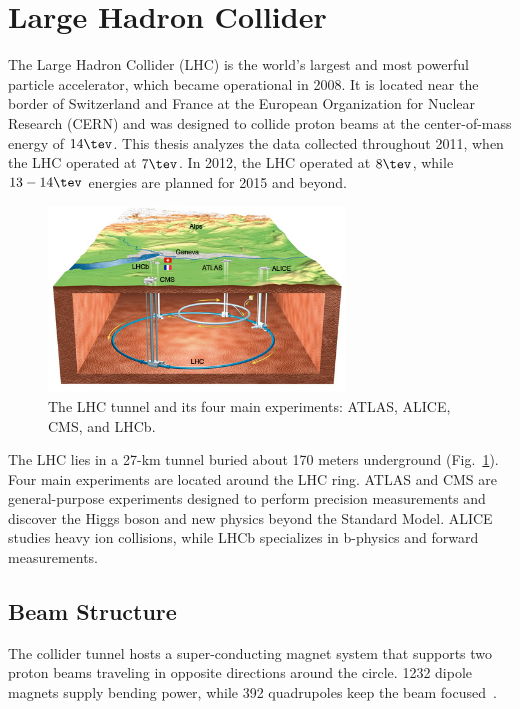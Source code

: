 
\section{ Large Hadron Collider}
The Large Hadron Collider (LHC) is the world's largest and most powerful particle accelerator, which became operational in 2008. It is located near the border of Switzerland and France at the European Organization for Nuclear Research (CERN) and was designed to collide proton beams at the center-of-mass energy of $14\tev$. This thesis analyzes the data collected throughout 2011, when the LHC operated at $7\tev$. In 2012, the LHC operated at $8\tev$, while $13-14\tev$ energies are planned for 2015 and beyond.

\begin{figure}[phtb]
  \begin{center}
    \includegraphics[width=0.7\textwidth]{det/fig/LHC_map}
    \caption{ The LHC tunnel and its four main experiments: ATLAS, ALICE, CMS, and LHCb.}
    \label{fig:det:tunnel}
  \end{center}
\end{figure}

The LHC lies in a 27-km tunnel buried about 170 meters underground (Fig.~\ref{fig:det:tunnel}). Four main experiments are located around the LHC ring. ATLAS and CMS are general-purpose experiments designed to perform precision measurements and discover the Higgs boson and new physics beyond the Standard Model. ALICE studies heavy ion collisions, while LHCb specializes in b-physics and forward measurements.

\subsection{ Beam Structure }
The collider tunnel hosts a super-conducting magnet system that supports two proton beams traveling in opposite directions around the circle. 1232 dipole magnets supply bending power, while 392 quadrupoles keep the beam focused~\cite{Brüning:782076}.

